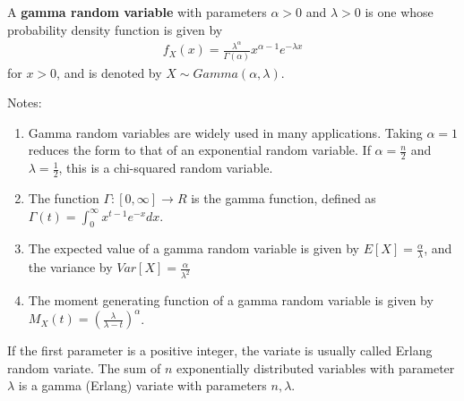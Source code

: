 \documentclass[12pt]{article}
\begin{document}
A \textbf{gamma random variable} with parameters $\alpha>0$ and $\lambda>0$ is one whose probability density function is given by
\begin{align*}
f_X(x) = \frac{ \lambda^\alpha}{\Gamma(\alpha)} x^{\alpha - 1} e^{-\lambda x}  
\end{align*}
for $x>0$, and is denoted by $X\sim Gamma(\alpha, \lambda)$.

Notes:\\
\begin{enumerate}
\item Gamma random variables are widely used in many applications. Taking $\alpha = 1$ reduces the form to that of an exponential random variable. If $\alpha = \frac{n}{2}$ and $\lambda = \frac{1}{2}$, this is a chi-squared random variable.
\item The function $\Gamma: [0,\infty] \to R$ is the gamma function, defined as $\Gamma(t) = \int_{0}^{\infty}{x^{t-1} e^{-x} dx}$. 
\item The expected value of a gamma random variable is given by $E[X]=\frac{\alpha}{\lambda}$, and the variance by $Var[X] = \frac{\alpha}{\lambda^2}$
\item The moment generating function of a gamma random variable is given by $M_X(t) = (\frac{\lambda}{\lambda - t})^\alpha$.
\end{enumerate}

If the first parameter is a positive integer, the variate is usually called Erlang random variate. The sum of $n$ exponentially distributed variables with parameter $\lambda$ is a gamma (Erlang) variate with parameters $n, \lambda$.
\end{document}
